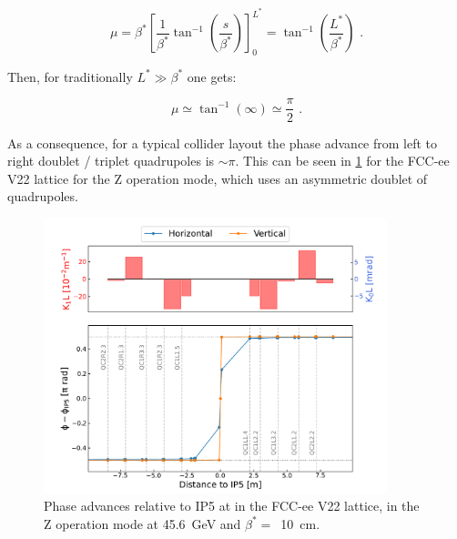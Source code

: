 \begin{equation}
    \mu = \beta^{\ast} \left[\frac{1}{\beta^{\ast}} \tan^{-1} \left(\frac{s}{\beta^{\ast}} \right) \right]_0^{L^*} = \tan^{-1} \left(\frac{L^*}{\beta^{\ast}} \right) \text{ .}
    \label{equation:collider_drift_space_phase_advance_integrated}
\end{equation}
\vspace{1pt}

Then, for traditionally \(L^* \gg \beta^{\ast}\) one gets:

\begin{equation}
    \mu \simeq \tan^{-1} \left( \infty \right) \simeq \frac{\pi}{2} \text{ .}
    \label{equation:collider_drift_space_phase_advance_approximation}
\end{equation}

As a consequence, for a typical collider layout the phase advance from left to right doublet / triplet quadrupoles is \(\sim \pi\).
This can be seen in \cref{figure:fccee_phases_to_ip5} for the FCC-ee~\cite{EPJST:Abada:FCCee_Lepton_Collider} V\num{22} lattice for the Z operation mode, which uses an asymmetric doublet of quadrupoles.

\begin{figure}[!htb]
    \centering
    \includegraphics*[width=0.89\textwidth]{Figures/IR_Coupling_Correction/fccee_phases_to_ip5.pdf}
    \caption{Phase advances relative to IP\num{5} at in the FCC-ee V22 lattice, in the Z operation mode at \qty{45.6}{\giga\electronvolt} and \(\beta^{\ast}=\)~\qty{10}{\centi\meter}.}
    \label{figure:fccee_phases_to_ip5}
\end{figure}

